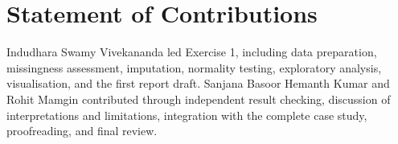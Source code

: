 \documentclass{MALEO_report}
\begin{document}
\section*{Statement of Contributions}
Indudhara Swamy Vivekananda led Exercise 1, including data preparation, missingness assessment, imputation, normality testing, exploratory analysis, visualisation, and the first report draft. Sanjana Basoor Hemanth Kumar and Rohit Mamgin contributed through independent result checking, discussion of interpretations and limitations, integration with the complete case study, proofreading, and final review.
\end{document}
